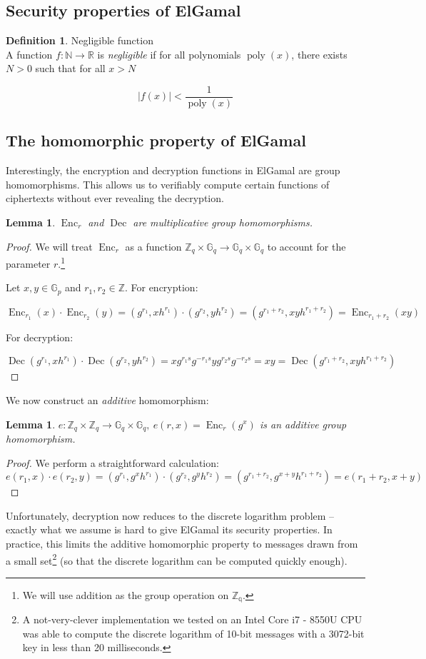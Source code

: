 \documentclass[11pt,twoside,a4paper]{article}
\DeclareMathOperator{\poly}{poly}
\DeclareMathOperator{\Enc}{Enc}
\DeclareMathOperator{\Dec}{Dec}
\newtheorem{lemma}[theorem]{Lemma}
\theoremstyle{definition}
\newtheorem{definition}{Definition}[section]
\begin{document}
\subsection{Security properties of ElGamal}
\begin{definition}{Negligible function}\\
    A function \(f:\mathbb{N}\rightarrow\mathbb{R}\) is \textit{negligible} if for all polynomials \(\poly(x)\), there exists \(N>0\) such that for all \(x>N\)

    \[|f(x)|<\frac{1}{\poly(x)}\]

\end{definition}
\subsection{The homomorphic property of ElGamal}
Interestingly, the encryption and decryption functions in ElGamal are group homomorphisms. This allows us to verifiably compute certain functions of ciphertexts without ever revealing the decryption.
\begin{lemma}\label{lem-mul-homom}
    \(\Enc_r\) and \(\Dec\) are multiplicative group homomorphisms.
\end{lemma}
\begin{proof}
    We will treat \(\Enc_r\) as a function \(\mathbb{Z}_q\times\mathbb{G}_q\rightarrow\mathbb{G}_q\times\mathbb{G}_q\) to account for the parameter \(r\).\footnote{We will use addition as the group operation on \(\mathbb{Z_q}\).}

    Let \(x,y\in\mathbb{G}_p\) and \(r_1,r_2\in\mathbb{Z}\). For encryption:
    
    \[\Enc_{r_1}(x)\cdot\Enc_{r_2}(y)=(g^{r_1},xh^{r_1})\cdot(g^{r_2},yh^{r_2})=(g^{r_1+r_2},xyh^{r_1+r_2})=\Enc_{r_1+r_2}(xy)\]

    For decryption:

    \[\Dec(g^{r_1},xh^{r_1})\cdot\Dec(g^{r_2},yh^{r_2})=xg^{r_1s}g^{-r_1s}yg^{r_2s}g^{-r_2s}=xy=\Dec(g^{r_1+r_2},xyh^{r_1+r_2})\]
\end{proof}

We now construct an \textit{additive} homomorphism:
\begin{lemma}
    \(e:\mathbb{Z}_q\times\mathbb{Z}_q\rightarrow\mathbb{G}_q\times\mathbb{G}_q,\ e(r, x)=\Enc_r(g^x)\) is an additive group homomorphism.
\end{lemma}
\begin{proof}
    We perform a straightforward calculation:
    \[e(r_1, x)\cdot e(r_2,y)=(g^{r_1},g^xh^{r_1})\cdot(g^{r_2},g^yh^{r_2})=(g^{r_1+r_2},g^{x+y}h^{r_1+r_2})=e(r_1+r_2, x+y)\]
\end{proof}
Unfortunately, decryption now reduces to the discrete logarithm problem -- exactly what we assume is hard to give ElGamal its security properties. In practice, this limits the additive homomorphic property to messages drawn from a small set\footnote{A not-very-clever implementation we tested on an Intel Core i7 - 8550U CPU was able to compute the discrete logarithm of 10-bit messages with a 3072-bit key in less than 20 milliseconds.} (so that the discrete logarithm can be computed quickly enough).
\end{document}
